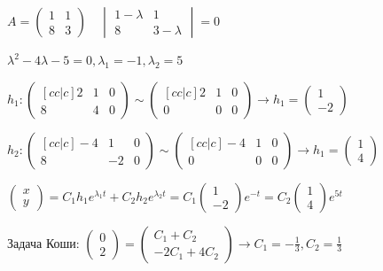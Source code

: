\documentclass[12pt]{article}
\begin{document}
    $A =
    \begin{pmatrix}
        1 & 1 \\ 8 & 3
    \end{pmatrix} \quad
    \begin{vmatrix}
        1 - \lambda & 1 \\ 8 & 3 - \lambda
    \end{vmatrix} = 0$

    $\lambda^2 - 4\lambda - 5 = 0, \lambda_1 = -1, \lambda_2 = 5$

    $h_1: \begin{pmatrix}[cc|c] 2 & 1 & 0 \\ 8 & 4 & 0\end{pmatrix} \sim \begin{pmatrix}[cc|c] 2 & 1 & 0 \\ 0 & 0 & 0\end{pmatrix} \to
    h_1 = \begin{pmatrix}1 \\ -2\end{pmatrix}$

    $h_2: \begin{pmatrix}[cc|c] -4 & 1 & 0 \\ 8 & -2 & 0\end{pmatrix} \sim \begin{pmatrix}[cc|c] -4 & 1 & 0 \\ 0 & 0 & 0\end{pmatrix} \to
    h_1 = \begin{pmatrix}1 \\ 4\end{pmatrix}$

    $\begin{pmatrix}x \\ y\end{pmatrix} = C_1 h_1 e^{\lambda_1 t} + C_2 h_2 e^{\lambda_2 t} =
    C_1 \begin{pmatrix}1 \\ -2\end{pmatrix} e^{-t} = C_2 \begin{pmatrix}1 \\ 4\end{pmatrix} e^{5t}$

    Задача Коши: $\begin{pmatrix}0 \\ 2\end{pmatrix} = \begin{pmatrix}
                                                           C_1 + C_2 \\ -2C_1 + 4C_2
    \end{pmatrix} \to C_1 = -\frac{1}{3}, C_2 = \frac{1}{3}$
\end{document}
